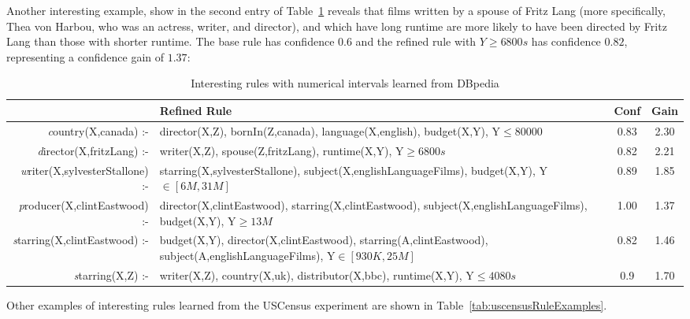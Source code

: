 Another interesting example, show  in the second entry of Table~\ref{tab:mdbRuleExamples} reveals that films written by
a spouse of Fritz Lang (more specifically, Thea von Harbou, who was an actress, writer, and director), and which have
long runtime are more likely to have been directed by Fritz Lang than those with shorter runtime. The base rule has
confidence $0.6$ and the refined rule with $Y\geq 6800s$ has confidence $0.82$, representing a confidence gain of
$1.37$:

\begin{table}[h!]
 \begin{center}
 \caption{Interesting rules with numerical intervals learned from DBpedia}
  \begin{tabular}{ >{\emph}r >{\raggedright}p{7cm} | c | c }
    \toprule
      & Refined Rule				& Conf 	& Gain \\
    \midrule
      country(X,canada) :-&director(X,Z), bornIn(Z,canada), language(X,english), budget(X,Y), Y$\leq 80000$ &
      0.83	& 2.30 \\ \hline
      director(X,fritzLang) :-&writer(X,Z), spouse(Z,fritzLang), runtime(X,Y), Y$\geq 6800s$ & 
      0.82	& 2.21 \\ \hline
      writer(X,sylvesterStallone) :-&starring(X,sylvesterStallone), subject(X,englishLanguageFilms),
      budget(X,Y), Y$\in [6M,31M]$ &
      0.89	& 1.85 \\ \hline
      producer(X,clintEastwood) :-&director(X,clintEastwood), starring(X,clintEastwood),
      subject(X,englishLanguageFilms), budget(X,Y), Y$\geq 13M$ &
      1.00	& 1.37 \\ \hline
      starring(X,clintEastwood) :- &budget(X,Y), director(X,clintEastwood), starring(A,clintEastwood), 
      subject(A,englishLanguageFilms), Y$\in [930K,25M]$&
      0.82	& 1.46 \\ \hline
      starring(X,Z) :-&writer(X,Z), country(X,uk), distributor(X,bbc), runtime(X,Y), Y$\leq 4080s$ &
      0.9	& 1.70 \\

    \bottomrule
  \end{tabular}
  \label{tab:mdbRuleExamples}
 \end{center}
\end{table}

Other examples of interesting rules learned from the USCensus experiment are shown in
Table~\ref{tab:uscensusRuleExamples}.

